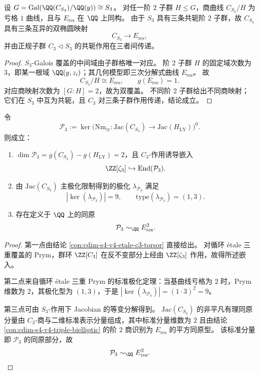 \begin{conclusion}[三重双椭圆结构与同构椭圆商]\label{con:cdim-s4-v4-triple-bielliptic}
设 \(G=\mathrm{Gal}(\QQ(C_{S_3})/\QQ(y))\cong S_3\)。
对任一阶 \(2\) 子群 \(H\le G\)，商曲线 \(C_{S_3}/H\) 为亏格 \(1\) 曲线，且与 \(E_{\mathrm{res}}\) 在 \(\QQ\) 上同构。
由于 \(S_3\) 具有三条共轭阶 \(2\) 子群，故 \(C_{S_3}\) 具有三条互异的双椭圆映射
\[
C_{S_3}\longrightarrow E_{\mathrm{res}},
\]
并由正规子群 \(C_3\triangleleft S_3\) 的共轭作用在三者间传递。
\end{conclusion}
\begin{proof}
\(S_3\)-Galois 覆盖的中间域由子群格唯一对应。
阶 \(2\) 子群 \(H\) 的固定域次数为 \(3\)，即某一根域 \(\QQ(y,z_i)\)；其几何模型即三次分解式曲线 \(E_{\mathrm{res}}\)。
故
\[
C_{S_3}/H\cong E_{\mathrm{res}},\qquad g(E_{\mathrm{res}})=1.
\]
对应商映射次数为 \([G:H]=2\)，故为双覆盖。
不同阶 \(2\) 子群给出不同商映射；它们在 \(S_3\) 中互为共轭，且 \(C_3\) 对三条子群作用传递，结论成立。
\end{proof}

\begin{conclusion}\label{con:cdim-s4-v4-prym-13-polarization}
令
\[
\mathcal P_{3}
:=
\ker\!\bigl(\mathrm{Nm}_{\varpi}:\mathrm{Jac}(C_{S_3})\to \mathrm{Jac}(H_{\mathrm{LY}})\bigr)^0.
\]
则成立：
\begin{enumerate}
  \item \(\dim \mathcal P_{3}=g(C_{S_3})-g(H_{\mathrm{LY}})=2\)，且 \(C_3\)-作用诱导嵌入
  \[
  \ZZ[\zeta_3]\hookrightarrow \mathrm{End}(\mathcal P_{3}).
  \]
  \item 由 \(\mathrm{Jac}(C_{S_3})\) 主极化限制得到的极化 \(\lambda_{\mathcal P_3}\) 满足
  \[
  |\ker(\lambda_{\mathcal P_3})|=9,\qquad
  \mathrm{type}(\lambda_{\mathcal P_3})=(1,3).
  \]
  \item 存在定义于 \(\QQ\) 上的同原
  \[
  \mathcal P_{3}\sim_{\QQ}E_{\mathrm{res}}^{2}.
  \]
\end{enumerate}
\end{conclusion}
\begin{proof}
第一点由结论 \ref{con:cdim-s4-v4-etale-c3-torsor} 直接给出。
对循环 étale 三重覆盖的 Prym，群环 \(\ZZ[C_3]\) 在反不变部分上经由
\(
\ZZ[\zeta_3]
\)
作用，故得所述嵌入。

第二点来自循环 étale 三重 Prym 的标准极化定理：当基曲线亏格为 \(2\) 时，Prym 维数为 \(2\)，其极化型为 \((1,3)\)，于是
\(
|\ker(\lambda_{\mathcal P_3})|=(1\cdot 3)^2=9
\)。

第三点可由 \(S_3\)-作用下 Jacobian 的等变分解得到。
\(\mathrm{Jac}(C_{S_3})\) 的非平凡有理同原分量由 \(C_3\)-商与二维标准表示分量组成，其中标准分量维数为 \(2\) 且由结论 \ref{con:cdim-s4-v4-triple-bielliptic} 的阶 \(2\) 商识别为 \(E_{\mathrm{res}}\) 的平方同原型。
该标准分量即 \(\mathcal P_3\) 的同原部分，故
\[
\mathcal P_3\sim_{\QQ}E_{\mathrm{res}}^2.
\]
\end{proof}

